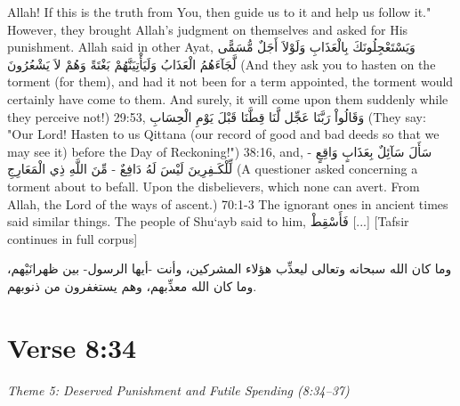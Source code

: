 \documentclass[11pt,a4paper,openany]{book}
\let\textAR\textarabic
\begin{document}
\begin{tafsirbox}
Allah! If this is the truth from You, then guide us to it and help us follow it." However, they brought Allah's judgment on themselves and asked for His punishment. Allah said in other Ayat, \textAR{وَيَسْتَعْجِلُونَكَ} \textAR{بِالْعَذَابِ} \textAR{وَلَوْلاَ} \textAR{أَجَلٌ} \textAR{مُّسَمًّى} \textAR{لَّجَآءَهُمُ} \textAR{الْعَذَابُ} \textAR{وَلَيَأْتِيَنَّهُمْ} \textAR{بَغْتَةً} \textAR{وَهُمْ} \textAR{لاَ} \textAR{يَشْعُرُونَ} (And they ask you to hasten on the torment (for them), and had it not been for a term appointed, the torment would certainly have come to them. And surely, it will come upon them suddenly while they perceive not!) 29:53, \textAR{وَقَالُواْ} \textAR{رَبَّنَا} \textAR{عَجِّل} \textAR{لَّنَا} \textAR{قِطَّنَا} \textAR{قَبْلَ} \textAR{يَوْمِ} \textAR{الْحِسَابِ} (They say: "Our Lord! Hasten to us Qittana (our record of good and bad deeds so that we may see it) before the Day of Reckoning!") 38:16, and, \textAR{سَأَلَ} \textAR{سَآئِلٌ} \textAR{بِعَذَابٍ} \textAR{وَاقِعٍ} - \textAR{لِّلْكَـفِرِينَ} \textAR{لَيْسَ} \textAR{لَهُ} \textAR{دَافِعٌ} - \textAR{مِّنَ} \textAR{اللَّهِ} \textAR{ذِي} \textAR{الْمَعَارِجِ} (A questioner asked concerning a torment about to befall. Upon the disbelievers, which none can avert. From Allah, the Lord of the ways of ascent.) 70:1-3 The ignorant ones in ancient times said similar things. The people of Shu`ayb said to him, \textAR{فَأَسْقِطْ}  [...] [Tafsir continues in full corpus]
\end{tafsirbox}


\begin{muyassarbox}
\textAR{وما كان الله سبحانه وتعالى ليعذِّب هؤلاء المشركين، وأنت -أيها الرسول- بين ظهرانَيْهم، وما كان الله معذِّبهم، وهم يستغفرون من ذنوبهم.}
\end{muyassarbox}


\newpage

\section{Verse 8:34}
{\small\color{accent2}\itshape Theme 5: Deserved Punishment and Futile Spending (8:34--37)}
\end{document}
